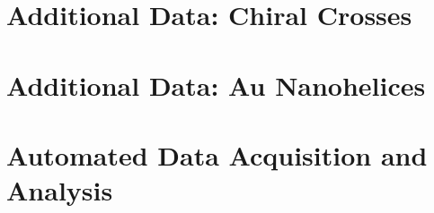 \documentclass[11pt,a4paper,final]{report}
\begin{document}
\chapter{Additional Data: Chiral Crosses}\label{sec:appendix:AdditionalCrosses}

\chapter{Additional Data: Au Nanohelices}\label{sec:appendix:AdditionalAuHelix}

\chapter{Automated Data Acquisition and Analysis}\label{sec:appendix:Code}

\end{document}
